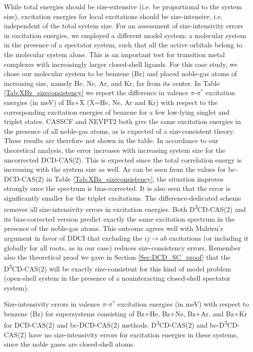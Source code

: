 While total energies should be size-extensive\cite{BartlP_1978_561} (i.e. be proportional to the system size), excitation energies for local excitations should be size-intensive,\cite{KochJJH_1990_3345} i.e. independent of the total system size. For an assessment of size-intensivity errors in excitation energies, we employed a different model system: a molecular system in the presence of a spectator system, such that all the active orbitals belong to the molecular system alone. This is an important test for transition metal complexes with increasingly larger closed-shell ligands. For this case study, we chose our molecular system to be benzene (Bz) and placed noble-gas atoms of increasing size, namely He, Ne, Ar, and Kr, far from its center. In Table \ref{Tab:XBz_sizeconsistency} we report the difference in valence $\pi$-$\pi^\ast$ excitation energies (in meV) of Bz+X (X=He, Ne, Ar and Kr) with respect to the corresponding excitation energies of benzene for a few low-lying singlet and triplet states. CASSCF and NEVPT2 both give the same excitation energies in the presence of all noble-gas atoms, as is expected of a size-consistent theory. These results are therefore not shown in the table. In accordance to our theoretical analysis, the error increases with increasing system size for the uncorrected DCD-CAS(2). This is expected since the total correlation energy is increasing with the system size as well. As can be seen from the values for bc-DCD-CAS(2) in Table \ref{Tab:XBz_sizeconsistency}, the situation improves strongly once the spectrum is bias-corrected. It is also seen that the error is significantly smaller for the triplet excitations. 
The difference-dedicated scheme removes all size-intensivity errors in excitation energies. Both D\textsuperscript{3}CD-CAS(2) and its bias-corrected version predict exactly the same excitation spectrum in the presence of the noble-gas atoms. This outcome agrees well with Malrieu’s argument in favor of DDCI that excluding the $ij\rightarrow ab$ excitations (or including it globally for all roots, as in our case) reduces size-consistency errors.\cite{MiralCCM_1993_33, GarciCCM_1995_222}
Remember also the theoretical proof we gave in Section \ref{Sec:DCD_SC_proof} that the D\textsuperscript{3}CD-CAS(2) will be exactly size-consistent for this kind of model problem (open-shell system in the presence of a noninteracting closed-shell spectator system).
\begin{table}
\small
\centering
\caption[Size-intensivity errors in valence $\pi$-$\pi^\ast$ excitation energies of benzene in the presence of a noninteracting noble-gas atom.]{Size-intensivity errors in valence $\pi$-$\pi^\ast$ excitation energies (in meV) with respect to benzene (Bz) for supersystems consisting of Bz+He, Bz+Ne, Bz+Ar, and Bz+Kr for DCD-CAS(2) and bc-DCD-CAS(2) methods. D\textsuperscript{3}CD-CAS(2) and bc-D\textsuperscript{3}CD-CAS(2) have no size-intensivity errors for excitation energies in these systems, since the noble gases are closed-shell atoms.}
\label{Tab:XBz_sizeconsistency}

\end{table}


